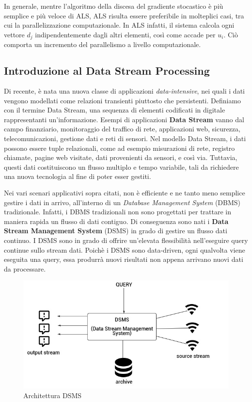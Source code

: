 \documentclass[12pt]{article}
\begin{document}
In generale, mentre l'algoritmo della discesa del gradiente stocastico è più semplice e più veloce di ALS, ALS risulta essere preferibile in molteplici casi, tra cui la parallelizzazione computazionale. In ALS infatti, il sistema calcola ogni vettore $d_j$ indipendentemente dagli altri elementi, così come accade per $u_i$. Ciò comporta un incremento del parallelismo a livello computazionale.

\subsection{Introduzione al Data Stream Processing}
Di recente, è nata una nuova classe di applicazioni \textit{data-intensive}, nei quali i dati vengono modellati come relazioni transienti piuttosto che persistenti. Definiamo con il termine Data Stream, una sequenza di elementi codificati in digitale rappresentanti un'informazione. Esempi di applicazioni \textbf{Data Stream} vanno dal campo finanziario, monitoraggio del traffico di rete, applicazioni web, sicurezza, telecomunicazioni, gestione dati e reti di sensori. Nel modello Data Stream, i dati possono essere tuple relazionali, come ad esempio misurazioni di rete, registro chiamate, pagine web visitate, dati provenienti da sensori, e così via. Tuttavia, questi dati costituiscono un flusso multiplo e tempo variabile, tali da richiedere una nuova tecnologia al fine di poter esser gestiti.

Nei vari scenari applicativi sopra citati, non è efficiente e ne tanto meno semplice gestire i dati in arrivo, all'interno di un \textit{Database Management System} (DBMS) tradizionale. Infatti, i DBMS tradizionali non sono progettati per trattare in maniera rapida un flusso di dati contiguo. Di conseguenza sono nati i \textbf{Data Stream Management System} (DSMS) in grado di gestire un flusso dati continuo. I DSMS sono in grado di offrire un'elevata flessibilità nell'eseguire query continue sullo stream dati. Poichè i DSMS sono data-driven, ogni qualvolta viene eseguita una query, essa produrrà nuovi risultati non appena arrivano nuovi dati da processare.

\begin{figure}[H]
	\centering
	\includegraphics[scale=0.50]{images/dsms.jpg}
	\caption{Architettura DSMS}
	\label{dsms}
\end{figure}
\end{document}
